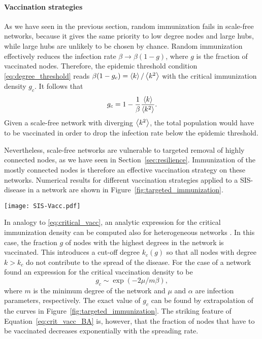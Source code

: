 \paragraph{Vaccination strategies\color{Cayenne}{.}}
As we have seen in the previous section, random immunization fails in scale-free networks, because it gives the same priority to low degree nodes and large hubs, while large hubs are unlikely to be chosen by chance.
Random immunization effectively reduces the infection rate $\beta \rightarrow \beta (1-g)$, where $g$ is the fraction of vaccinated nodes.
Therefore, the epidemic threshold condition \eqref{eq:degree_threshold} reads $\beta (1-g_c)=\left< k \right>/\left< k^2 \right>$ with the critical immunization density $g_c$.
It follows that
\begin{equation}\label{eq:critical_vacc}
g_c=1- \frac{1}{\beta } \frac{\left< k \right>}{\left< k^2 \right>}.
\end{equation}
Given a scale-free network with diverging $\left< k^2 \right>$, the total population would have to be vaccinated in order to drop the infection rate below the epidemic threshold.

Nevertheless, scale-free networks are vulnerable to targeted removal of highly connected nodes, as we have seen in Section~\ref{sec:resilience}.
Immunization of the mostly connected nodes is therefore an effective vaccination strategy on these networks.
Numerical results for different vaccination strategies applied to a SIS-disease in a \BA network are shown in Figure~\ref{fig:targeted_immunization}.
%
\begin{SCfigure}
\texttt{[image: SIS-Vacc.pdf]}
\caption{Targeted and random vaccination for an SIS-type disease in a \BA network with $10^5$ nodes and $m=4$.
Infection parameters $\beta / \mu =2$.}
\label{fig:targeted_immunization}
\end{SCfigure}
%

In analogy to \eqref{eq:critical_vacc}, an analytic expression for the critical immunization density can be computed also for heterogeneous networks \citep{PastorSat:immunization}.
In this case, the fraction $g$ of nodes with the highest degrees in the network is vaccinated.
This introduces a cut-off degree $k_c(g)$ so that all nodes with degree $k>k_c$ do not contribute to the spread of the disease.
For the case of a \BA network \citeauthor{PastorSat:immunization} found an expression for the critical vaccination density to be
\begin{equation}\label{eq:crit_vacc_BA}
g_c \sim \exp (-2\mu / m\beta ),
\end{equation}
where $m$ is the minimum degree of the network and $\mu $ and $\alpha $ are infection parameters, respectively.
The exact value of $g_c$ can be found by extrapolation of the curves in Figure~\ref{fig:targeted_immunization}.
The striking feature of Equation~\eqref{eq:crit_vacc_BA} is, however, that the fraction of nodes that have to be vaccinated decreases exponentially with the spreading rate.

